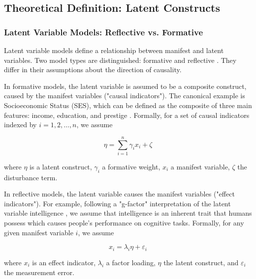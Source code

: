 \subsection{Theoretical Definition: Latent Constructs}

\subsubsection{Latent Variable Models: Reflective vs. Formative}

Latent variable models define a relationship between manifest and latent variables. Two model types are distinguished: formative and reflective \citep{bollen1991conventional}. They differ in their assumptions about the direction of causality. 

In formative models, the latent variable is assumed to be a composite construct, caused by the manifest variables ("causal indicators"). The canonical example is Socioeconomic Status (SES), which can be defined as the composite of three main features: income, education, and prestige \citep{mcquitty2013structural}. Formally, for a set of causal indicators indexed by $i = 1,2, \dots ,n$, we assume

\begin{equation}
    \eta = \sum_{i=1}^{n} \gamma_i x_i + \zeta
\end{equation}

where $\eta$ is a latent construct, $\gamma_i$ a formative weight, $x_i$ a manifest variable, $\zeta$ the disturbance term. 

In reflective models, the latent variable causes the manifest variables ("effect indicators"). For example, following a "g-factor" interpretation of the latent variable intelligence \citep{spearman1961general}, we assume that intelligence is an inherent trait that humans possess which causes people's performance on cognitive tasks. Formally, for any given manifest variable $i$, we assume

\begin{equation}\label{formative_model}
    x_i = \lambda_i \eta + \varepsilon_i
\end{equation}

where $x_i$ is an effect indicator, $\lambda_i$ a factor loading, $\eta$ the latent construct, and $\varepsilon_i$ the measurement error.



